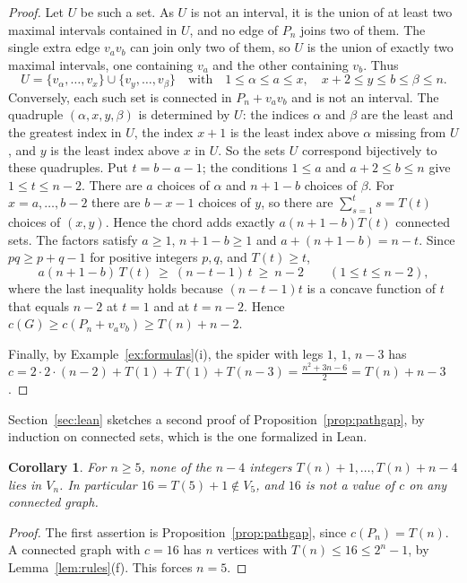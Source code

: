 \documentclass[11pt]{amsart}
\newtheorem{corollary}[theorem]{Corollary}
\theoremstyle{definition}
\theoremstyle{remark}
\newcommand{\Tr}[1]{T(#1)}
\begin{document}
\begin{proof}
Let $U$ be such a set. As $U$ is not an interval, it is the union of at least two maximal intervals contained in $U$, and no edge of $P_n$ joins two of them. The single extra edge $v_av_b$ can join only two of them, so $U$ is the union of exactly two maximal intervals, one containing $v_a$ and the other containing $v_b$. Thus
\[
U=\{v_\alpha,\dots,v_x\}\cup\{v_y,\dots,v_\beta\}\quad\text{with}\quad1\le\alpha\le a\le x,\quad x+2\le y\le b\le\beta\le n.
\]
Conversely, each such set is connected in $P_n+v_av_b$ and is not an interval. The quadruple $(\alpha,x,y,\beta)$ is determined by $U$: the indices $\alpha$ and $\beta$ are the least and the greatest index in $U$, the index $x+1$ is the least index above $\alpha$ missing from $U$, and $y$ is the least index above $x$ in $U$. So the sets $U$ correspond bijectively to these quadruples. Put $t=b-a-1$; the conditions $1\le a$ and $a+2\le b\le n$ give $1\le t\le n-2$. There are $a$ choices of $\alpha$ and $n+1-b$ choices of $\beta$. For $x=a,\dots,b-2$ there are $b-x-1$ choices of $y$, so there are $\sum_{s=1}^{t}s=\Tr{t}$ choices of $(x,y)$. Hence the chord adds exactly $a(n+1-b)\Tr{t}$ connected sets. The factors satisfy $a\ge1$, $n+1-b\ge1$ and $a+(n+1-b)=n-t$. Since $pq\ge p+q-1$ for positive integers $p,q$, and $\Tr{t}\ge t$,
\[
a(n+1-b)\,\Tr{t}\ \ge\ (n-t-1)\,t\ \ge\ n-2\qquad(1\le t\le n-2),
\]
where the last inequality holds because $(n-t-1)t$ is a concave function of $t$ that equals $n-2$ at $t=1$ and at $t=n-2$. Hence $c(G)\ge c(P_n+v_av_b)\ge\Tr{n}+n-2$.

Finally, by Example~\ref{ex:formulas}(i), the spider with legs $1$, $1$, $n-3$ has $c=2\cdot2\cdot(n-2)+\Tr{1}+\Tr{1}+\Tr{n-3}=\frac{n^2+3n-6}2=\Tr{n}+n-3$.
\end{proof}

Section~\ref{sec:lean} sketches a second proof of Proposition~\ref{prop:pathgap}, by induction on connected sets, which is the one formalized in Lean.

\begin{corollary}\label{cor:gap}
For $n\ge5$, none of the $n-4$ integers $\Tr{n}+1,\dots,\Tr{n}+n-4$ lies in $V_n$. In particular $16=\Tr{5}+1\notin V_5$, and $16$ is not a value of $c$ on any connected graph.
\end{corollary}

\begin{proof}
The first assertion is Proposition~\ref{prop:pathgap}, since $c(P_n)=\Tr{n}$. A connected graph with $c=16$ has $n$ vertices with $\Tr{n}\le16\le2^n-1$, by Lemma~\ref{lem:rules}(f). This forces $n=5$.
\end{proof}
\end{document}
